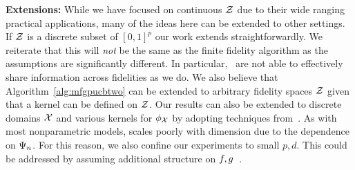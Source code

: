 





\textbf{Extensions:}
While we have focused on continuous $\mathcal{Z}$ due to their wide ranging
practical applications, many of the ideas here can be extended to other settings.
If $\mathcal{Z}$ is a discrete subset of $[0,1]^p$ our work extends straightforwardly.
We reiterate that this will \emph{not} be the same as the finite fidelity
\mfgpucbones algorithm as the assumptions are significantly different.
In particular,~\citet{kandasamy16mfbo} are not able to effectively share
information across fidelities as we do.
We also believe that Algorithm~\ref{alg:mfgpucbtwo} can be extended to arbitrary fidelity
spaces $\mathcal{Z}$ given that a kernel can be defined on $\mathcal{Z}$.
Our results can also be extended to discrete domains $\mathcal{X}$
and various kernels for $\phi_{\mathcal{X}}$ by adopting techniques 
from~\citet{srinivas10gpbandits}.
As with most nonparametric models, \mfgpucbtwos scales poorly with
dimension due to the dependence on $\Psi_{n}$.
For this reason, we also confine our experiments to small $p,d$.
This could be addressed by assuming additional structure on
$f,g$~\citep{djolonga13highdimbandits,kandasamy15addBO}.


